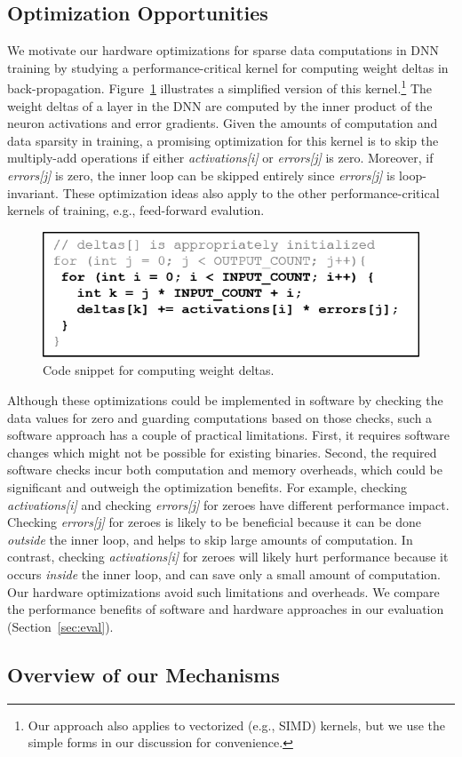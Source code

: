 \subsection{Optimization Opportunities}
\label{subsec:sparse_code_oppor}
We motivate our hardware optimizations for sparse data computations in DNN training by studying a performance-critical kernel for computing weight deltas in back-propagation.  Figure~\ref{fig:deltas_source_code} illustrates a simplified version of this kernel.\footnote{Our approach also applies to vectorized (e.g., SIMD) kernels, but we use the simple forms in our discussion for convenience.}   The weight deltas of a layer in the DNN are computed by the inner product of the neuron activations and error gradients.  Given the amounts of computation and data sparsity in training, a promising optimization for this kernel is to skip the multiply-add operations if either \emph{activations[i]} or \emph{errors[j]} is zero.  Moreover,  if \emph{errors[j]} is zero, the inner loop can be skipped entirely since \emph{errors[j]} is loop-invariant. These optimization ideas also apply to the other performance-critical kernels of training, e.g., feed-forward evalution. 

\begin{figure}[h]
 \centering
 \includegraphics[width=.9\columnwidth]{Figures/deltas_source_code.png}
\caption{Code snippet for computing weight deltas.}
 \label{fig:deltas_source_code}
 \end{figure}

Although these optimizations could be implemented in software by checking the data values for zero and guarding computations based on those checks, such a software approach has a couple of practical limitations.   First, it requires software changes which might not be possible for existing binaries.   Second, the required software checks incur both computation and memory overheads, which could be significant and outweigh the optimization benefits.  For example, checking \emph{activations[i]} and checking \emph{errors[j]} for zeroes have different performance impact.  Checking \emph{errors[j]} for zeroes is likely to be beneficial because it can be done \emph{outside} the inner loop, and helps to skip large amounts of computation. In contrast, checking \emph{activations[i]} for zeroes will likely hurt performance because it occurs \emph{inside} the inner loop, and can save only a small amount of computation. Our hardware optimizations  avoid such limitations and overheads.  We compare the performance benefits of software and hardware approaches in our evaluation (Section~\ref{sec:eval}). 


\subsection{Overview of our Mechanisms}

